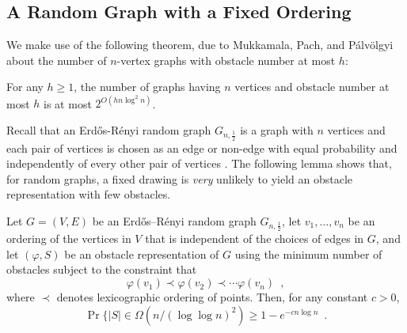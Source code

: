 \documentclass{patmorin}
\begin{document}
\subsection{A Random Graph with a Fixed Ordering}

We make use of the following theorem, due to Mukkamala, Pach, and
P\'alv\"olgyi \cite[Theorem~1]{mukkamala.pach.ea:lower} about the number
of $n$-vertex graphs with obstacle number at most $h$:
\begin{thm}
  For any $h\ge 1$, the number of graphs having $n$ vertices and
  obstacle number at most $h$ is at most $2^{O(hn\log^2 n)}$.
\end{thm}

Recall that an Erd\H{o}s-R\'enyi random graph $G_{n,\frac{1}{2}}$ is a
graph with $n$ vertices and each pair of vertices is chosen as an edge
or non-edge with equal probability and independently of every other pair
of vertices \cite{erdos.renyi:random}.  The following lemma shows that,
for random graphs, a fixed drawing is \emph{very} unlikely to yield
an obstacle representation with few obstacles.


\begin{lem}
  Let $G=(V,E)$ be an Erd\H{o}s--R\'enyi random graph $G_{n,\frac{1}{2}}$,
  let $v_1,\ldots,v_n$ be an ordering of the vertices
  in $V$ that is independent of the choices of edges in $G$,
  and let $(\varphi, S)$ be an obstacle representation of $G$
  using the minimum number of obstacles subject to the constraint
  that 
  \[ \varphi(v_1)\prec \varphi(v_2)\prec \cdots\varphi(v_n) \enspace ,\]
  where $\prec$ denotes lexicographic ordering of points.
  Then, for any constant $c>0$,
  \[
     \Pr\{|S| \in \Omega(n/(\log\log n)^2) \ge 1-e^{-cn\log n}  \enspace .
  \] 
\end{lem}
\end{document}
